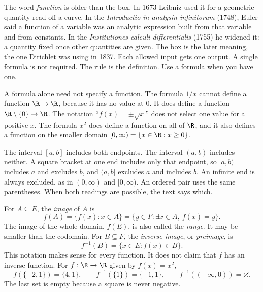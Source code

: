 The word \emph{function} is older than the box. In 1673 Leibniz used it for a geometric quantity read off a curve. In the \emph{Introductio in analysin infinitorum} (1748), Euler said a function of a variable was an analytic expression built from that variable and from constants. In the \emph{Institutiones calculi differentialis} (1755) he widened it: a quantity fixed once other quantities are given. The box is the later meaning, the one Dirichlet was using in 1837. Each allowed input gets one output. A single formula is not required. The rule is the definition. Use a formula when you have one.

\begin{center}
\end{center}

A formula alone need not specify a function. The formula $1/x$ cannot define a function $\R\to\R$, because it has no value at $0$. It does define a function $\R\setminus\{0\}\to\R$. The notation ``$f(x)=\pm\sqrt{x}$'' does not select one value for a positive $x$. The formula $x^2$ does define a function on all of $\R$, and it also defines a function on the smaller domain $[0,\infty)=\{x\in\R:x\ge 0\}$.

\begin{definitionx}
The interval $[a,b]$ includes both endpoints. The interval $(a,b)$ includes neither. A square bracket at one end includes only that endpoint, so $[a,b)$ includes $a$ and excludes $b$, and $(a,b]$ excludes $a$ and includes $b$. An infinite end is always excluded, as in $(0,\infty)$ and $[0,\infty)$. An ordered pair uses the same parentheses. When both readings are possible, the text says which.
\end{definitionx}

For $A\subseteq E$, the \emph{image} of $A$ is
\[
f(A)=\{f(x):x\in A\}=\{y\in F:\exists x\in A,\ f(x)=y\}.
\]
The image of the whole domain, $f(E)$, is also called the \emph{range}. It may be smaller than the codomain. For $B\subseteq F$, the \emph{inverse image}, or \emph{preimage}, is
\[
f^{-1}(B)=\{x\in E:f(x)\in B\}.
\]
This notation makes sense for every function. It does not claim that $f$ has an inverse function. For $f:\R\to\R$ given by $f(x)=x^2$,
\[
f(\{-2,1\})=\{4,1\},\qquad f^{-1}(\{1\})=\{-1,1\},\qquad f^{-1}((-\infty,0))=\varnothing.
\]
The last set is empty because a square is never negative.

